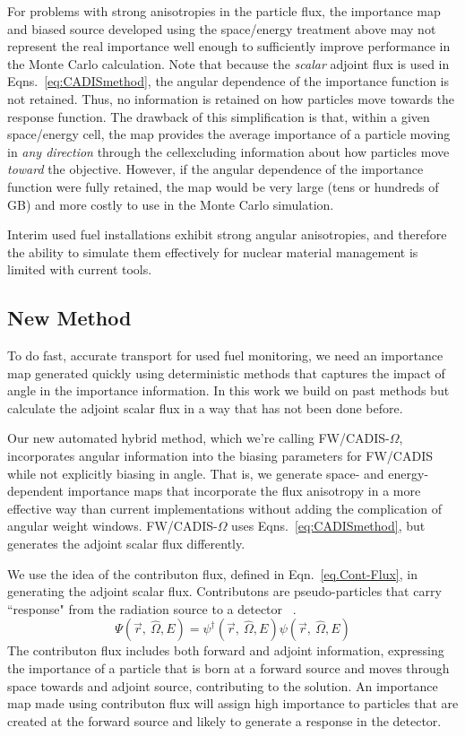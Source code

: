 \documentclass[12pt]{article}
\begin{document}
For problems with strong anisotropies in the particle flux, the importance map and biased source developed using the space/energy treatment above may not represent the real importance well enough to sufficiently improve performance in the Monte Carlo calculation. 
Note that because the \textit{scalar} adjoint flux is used in Eqns.~\eqref{eq:CADISmethod}, the angular dependence of the importance function is not retained. 
Thus, no information is retained on how particles move towards the response function. 
The drawback of this simplification is that, within a given space/energy cell, the map provides the average importance of a particle moving in \textit{any direction} through the cell\textemdash excluding information about how particles move \textit{toward} the objective. 
However, if the angular dependence of the importance function were fully retained, the map would be very large (tens or hundreds of GB) and more costly to use in the Monte Carlo simulation. 

Interim used fuel installations exhibit strong angular anisotropies, and therefore the ability to simulate them effectively for nuclear material management is limited with current tools. 

\subsection{New Method}
To do fast, accurate transport for used fuel monitoring, we need an importance map generated quickly using deterministic methods that captures the impact of angle in the importance information. 
In this work we build on past methods but calculate the adjoint scalar flux in a way that has not been done before.

Our new automated hybrid method, which we're calling FW/CADIS-$\Omega$, incorporates angular information into the biasing parameters for FW/CADIS while not explicitly biasing in angle. 
That is, we generate space- and energy-dependent importance maps that incorporate the flux anisotropy in a more effective way than current implementations without adding the complication of angular weight windows. 
FW/CADIS-$\Omega$ uses Eqns.~\eqref{eq:CADISmethod}, but generates the adjoint scalar flux differently. 

We use the idea of the contributon flux, defined in Eqn.~\eqref{eq.Cont-Flux}, in generating the adjoint scalar flux. 
Contributons are pseudo-particles that carry ``response" from the radiation source to a detector ~\cite{williams_generalized_1991,williams_contributorn_1992,williams_contributon_study}. 
%
\begin{equation}
\Psi (\vec {r},\:\hat\Omega ,E) = \psi^{\dagger} (\vec {r},\:\hat\Omega ,E) \psi(\vec {r} ,\:\hat\Omega,E)
\label{eq.Cont-Flux} 
\end{equation}
%
The contributon flux includes both forward and adjoint information, expressing the importance of a particle that is born at a forward source and moves through space towards and adjoint source, contributing to the solution.
An importance map made using contributon flux will assign high importance to particles that are created at the forward source and likely to generate a response in the detector. 
\end{document}
